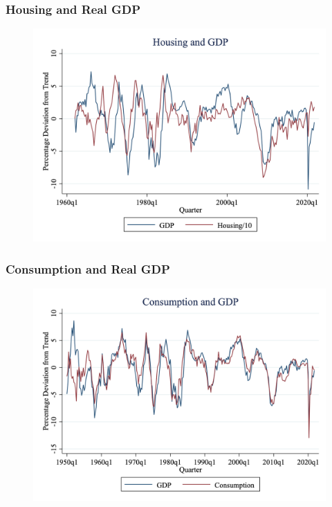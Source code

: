 \documentclass{beamer}
\begin{document}
\begin{frame}
\frametitle[alignment=center]{Housing and Real GDP}
\begin{figure}
\centering
\includegraphics[scale=0.25]{Figures/Fig_3pt8.png}
\end{figure}
\end{frame}

\begin{frame}
\frametitle[alignment=center]{Consumption and Real GDP}
\begin{figure}
\centering
\includegraphics[scale=0.25]{Figures/Fig_3pt9.png}
\end{figure}
\end{frame}
\end{document}
